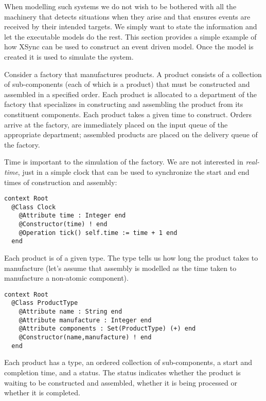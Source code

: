 \documentclass{article}
\begin{document}
When modelling such systems we do not wish to be bothered with all the machinery that
detects situations when they arise and that ensures events are received by their intended
targets. We simply want to state the information and let the executable models do the rest.
This section provides a simple example of how XSync can be used to construct an event driven
model. Once the model is created it is used to simulate the system.

Consider a factory that manufactures products. A product consists of a collection
of sub-components (each of which is a product) that must be constructed and assembled in 
a specified order. Each product is allocated to a department of the factory that specializes 
in constructing and assembling the product from its constituent components. Each product 
takes a given time to construct. Orders arrive at the factory, are immediately placed on the 
input queue of the appropriate department; assembled products are placed on the delivery queue 
of the factory.

Time is important to the simulation of the factory. We are not interested in {\em real-time},
just in a simple clock that can be used to synchronize the start and end times of construction
and assembly:
\begin{verbatim}
context Root
  @Class Clock
    @Attribute time : Integer end
    @Constructor(time) ! end
    @Operation tick() self.time := time + 1 end
  end
\end{verbatim}
Each product is of a given type. The type tells us how long the product takes to
manufacture (let's assume that assembly is modelled as the time taken to manufacture
a non-atomic component).
\begin{verbatim}
context Root
  @Class ProductType
    @Attribute name : String end
    @Attribute manufacture : Integer end
    @Attribute components : Set(ProductType) (+) end
    @Constructor(name,manufacture) ! end
  end
\end{verbatim}
Each product has a type, an ordered collection of sub-components, a start and completion time, 
and a status. The status indicates whether the product is waiting to be constructed and assembled,
whether it is being processed or whether it is completed.
\end{document}
